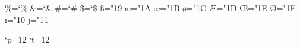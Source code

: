 \def\hang{\hangindent\parindent}
\def\textindent#1{\indent\llap{#1\enspace}\ignorespaces}
\def\item{\par\hang\textindent}
\def\itemitem{\par\indent \hangindent2\parindent \textindent}
\def\narrower{\advance\leftskip\parindent
  \advance\rightskip\parindent}

\outer{}
\outer{}

\def\raggedright{\rightskip\z@ plus2em \spaceskip.3333em \xspaceskip.5em\relax}
\def\ttraggedright{\tt\rightskip\z@ plus2em\relax} %

\chardef\%=`\%
\chardef\&=`\&
\chardef\#=`\#
\chardef\$=`\$
\chardef\ss="19
\chardef\ae="1A
\chardef\oe="1B
\chardef\o="1C
\chardef\AE="1D
\chardef\OE="1E
\chardef\O="1F
\chardef\i="10 \chardef\j="11 %
\def\aa{\accent23a}
\def\l{\char32l}
\def\L{\leavevmode\setbox0\hbox{L}\hbox to\wd0{\hss\char32L}}

\def\leavevmode{\unhbox\voidb@x} %
\def\_{\leavevmode \kern.06em \vbox{\hrule width.3em}}
\def\AA{\leavevmode\setbox0\hbox{!}\dimen@\ht0\advance\dimen@-1ex%
  \rlap{\raise.67\dimen@\hbox{\char'27}}A}

\def\mathhexbox#1#2#3{\leavevmode
  \hbox{$\m@th \mathchar"#1#2#3$}}
\def\dag{\mathhexbox279}
\def\ddag{\mathhexbox27A}
\def\S{\mathhexbox278}
\def\P{\mathhexbox27B}
\def\Orb{\mathhexbox20D}

\def\oalign#1{\leavevmode\vtop{\baselineskip\z@skip \lineskip.25ex%
  \ialign{##\crcr#1\crcr}}} \def\o@lign{\lineskiplimit\z@ \oalign}
\def\ooalign{\lineskiplimit-\maxdimen \oalign} %
{\catcode`p=12 \catcode`t=12 \gdef\\#1pt{#1}} \let\getf@ctor=\\
\def\sh@ft#1{\dimen@#1\kern\expandafter\getf@ctor\the\fontdimen1\font
  \dimen@} %
\def\d#1{{\o@lign{\relax#1\crcr\hidewidth\sh@ft{-1ex}.\hidewidth}}}
\def\b#1{{\o@lign{\relax#1\crcr\hidewidth\sh@ft{-3ex}%
    \vbox to.2ex{\hbox{\char22}\vss}\hidewidth}}}
\def\c#1{{\setbox\z@\hbox{#1}\ifdim\ht\z@=1ex\accent24 #1%
  \else\ooalign{\unhbox\z@\crcr\hidewidth\char24\hidewidth}\fi}}
\def\copyright{{\ooalign{\hfil\raise.07ex\hbox{c}\hfil\crcr\Orb}}}

